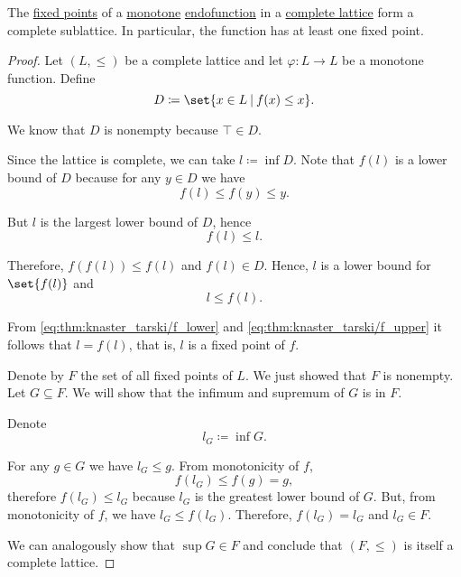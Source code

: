 \begin{theorem}\label{thm:knaster_tarski_theorem}
  The \hyperref[def:fixed_point]{fixed points} of a \hyperref[def:partially_ordered_set/homomorphism]{monotone} \hyperref[def:multi_valued_function/endofunction]{endofunction} in a \hyperref[def:semilattice/lattice]{complete lattice} form a complete sublattice. In particular, the function has at least one fixed point.
\end{theorem}
\begin{proof}
  Let \( (L, \leq) \) be a complete lattice and let \( \varphi: L \to L \) be a monotone function. Define
  \begin{equation*}
    D \coloneqq \set{ x \in L \given f(x) \leq x }.
  \end{equation*}

  We know that \( D \) is nonempty because \( \top \in D \).

  Since the lattice is complete, we can take \( l \coloneqq \inf D \). Note that \( f(l) \) is a lower bound of \( D \) because for any \( y \in D \) we have
  \begin{equation*}
    f(l) \leq f(y) \leq y.
  \end{equation*}

  But \( l \) is the largest lower bound of \( D \), hence
  \begin{equation}\label{eq:thm:knaster_tarski/f_lower}
    f(l) \leq l.
  \end{equation}

  Therefore, \( f(f(l)) \leq f(l) \) and \( f(l) \in D \). Hence, \( l \) is a lower bound for \( \set{ f(l) } \) and
  \begin{equation}\label{eq:thm:knaster_tarski/f_upper}
    l \leq f(l).
  \end{equation}

  From \eqref{eq:thm:knaster_tarski/f_lower} and \eqref{eq:thm:knaster_tarski/f_upper} it follows that \( l = f(l) \), that is, \( l \) is a fixed point of \( f \).

  Denote by \( F \) the set of all fixed points of \( L \). We just showed that \( F \) is nonempty. Let \( G \subseteq F \). We will show that the infimum and supremum of \( G \) is in \( F \).

  Denote
  \begin{equation*}
    l_G \coloneqq \inf G.
  \end{equation*}

  For any \( g \in G \) we have \( l_G \leq g \). From monotonicity of \( f \),
  \begin{equation*}
    f(l_G) \leq f(g) = g,
  \end{equation*}
  therefore \( f(l_G) \leq l_G \) because \( l_G \) is the greatest lower bound of \( G \). But, from monotonicity of \( f \), we have \( l_G \leq f(l_G) \). Therefore, \( f(l_G) = l_G \) and \( l_G \in F \).

  We can analogously show that \( \sup G \in F \) and conclude that \( (F, \leq) \) is itself a complete lattice.
\end{proof}

